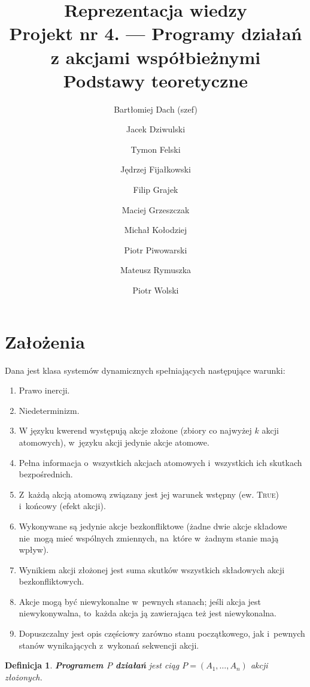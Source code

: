 \documentclass[11pt,a4paper]{article}
\newtheorem{defn}{Definicja}
\begin{document}
\title{Reprezentacja wiedzy \\
\Large{
    Projekt nr 4. --- Programy działań z akcjami współbieżnymi \\
    Podstawy teoretyczne
}}
\author{
    Bartłomiej Dach (szef) \and
    Jacek Dziwulski \and
    Tymon Felski \and
    Jędrzej Fijałkowski \and
    Filip Grajek \and
    Maciej Grzeszczak \and
    Michał Kołodziej \and
    Piotr Piwowarski \and
    Mateusz Rymuszka \and
    Piotr Wolski
}
\maketitle

\section{Założenia}

Dana jest klasa systemów dynamicznych spełniających następujące warunki:

\begin{enumerate}
    \item Prawo inercji.
    \item Niedeterminizm.
    \item W języku kwerend występują akcje złożone (zbiory co najwyżej $k$ akcji atomowych), w~języku akcji jedynie akcje atomowe.
    \item Pełna informacja o~wszystkich akcjach atomowych i~wszystkich ich skutkach bezpośrednich.
    \item Z~każdą akcją atomową związany jest jej warunek wstępny (ew. \textsc{True}) i~końcowy (efekt akcji).
    \item Wykonywane są jedynie akcje bezkonfliktowe (żadne dwie akcje składowe nie~mogą mieć wspólnych zmiennych, na~które w~żadnym stanie mają wpływ).
    \item Wynikiem akcji złożonej jest suma skutków wszystkich składowych akcji bezkonfliktowych.
    \item Akcje mogą być niewykonalne w~pewnych stanach; jeśli akcja jest niewykonywalna, to~każda akcja ją zawierająca też jest niewykonalna.
    \item Dopuszczalny jest opis częściowy zarówno stanu początkowego, jak i~pewnych stanów wynikających z~wykonań sekwencji akcji.
\end{enumerate}

\begin{defn}
    \textbf{Programem $P$ działań} jest ciąg $P = (A_1, \dots,A_n)$ akcji złożonych.
\end{defn}
\end{document}
